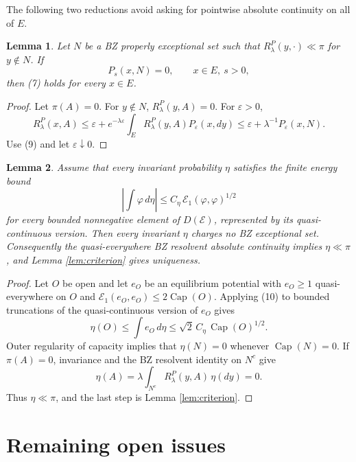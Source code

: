 \documentclass[12pt]{article}
\newtheorem{lemma}{Lemma}
\newcommand{\1}{\mathbf 1}
\newcommand{\cE}{\mathcal E}
\newcommand{\capacity}{\operatorname{Cap}}
\begin{document}
The following two reductions avoid asking for pointwise absolute
continuity on all of \(E\).

\begin{lemma}\label{lem:entrance}
Let \(N\) be a BZ properly exceptional set such that
\(R_\lambda^P(y,\cdot)\ll\pi\) for \(y\notin N\).  If
\[
          P_s(x,N)=0,\qquad x\in E,\ s>0,              \tag{9}
\]
then (7) holds for every \(x\in E\).
\end{lemma}

\begin{proof}
Let \(\pi(A)=0\).  For \(y\notin N\), \(R_\lambda^P(y,A)=0\).  For
\(\varepsilon>0\),
\[
 R_\lambda^P(x,A)
 \le \varepsilon
  +e^{-\lambda\varepsilon}\int_E R_\lambda^P(y,A)P_\varepsilon(x,dy)
 \le \varepsilon+\lambda^{-1}P_\varepsilon(x,N).
\]
Use (9) and let \(\varepsilon\downarrow0\).
\end{proof}

\begin{lemma}\label{lem:capacity}
Assume that every invariant probability \(\eta\) satisfies the finite
energy bound
\[
       \left|\int \varphi\,d\eta\right|
       \le C_\eta\,\cE_1(\varphi,\varphi)^{1/2}       \tag{10}
\]
for every bounded nonnegative element of \(D(\cE)\), represented by its
quasi-continuous version.
Then every invariant \(\eta\) charges no BZ exceptional set.  Consequently
the quasi-everywhere BZ resolvent absolute continuity implies
\(\eta\ll\pi\), and Lemma \ref{lem:criterion} gives uniqueness.
\end{lemma}

\begin{proof}
Let \(O\) be open and let \(e_O\) be an equilibrium potential with
\(e_O\ge1\) quasi-everywhere on \(O\) and
\(\cE_1(e_O,e_O)\le 2\capacity(O)\).  Applying (10) to bounded truncations of
the quasi-continuous version of \(e_O\) gives
\[
       \eta(O)\le \int e_O\,d\eta
          \le \sqrt2\, C_\eta\,\capacity(O)^{1/2}.
\]
Outer regularity of capacity implies that \(\eta(N)=0\) whenever
\(\capacity(N)=0\).  If \(\pi(A)=0\), invariance and the BZ resolvent identity
on \(N^c\) give
\[
   \eta(A)=\lambda\int_{N^c}R_\lambda^P(y,A)\,\eta(dy)=0.
\]
Thus \(\eta\ll\pi\), and the last step is Lemma \ref{lem:criterion}.
\end{proof}

\section*{Remaining open issues}
\end{document}
